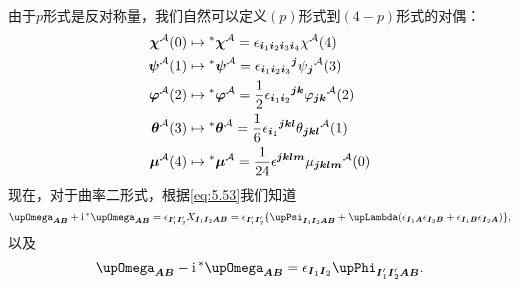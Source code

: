 由于$p$形式是反对称量，我们自然可以定义$( p)$形式到$( 4-p)$形式的对偶：
\begin{equation*}
	\begin{aligned}
		\boldsymbol{\chi}^{\mathcal{A}}( 0) & \mapsto \prescript{*}{}{}\boldsymbol{\chi}^{\mathcal{A}} =\epsilon _{\boldsymbol{i}_{1}\boldsymbol{i}_{2}\boldsymbol{i}_{3}\boldsymbol{i}_{4}} \chi ^{\mathcal{A}}( 4)\\
		\boldsymbol{\psi}^{\mathcal{A}}( 1) & \mapsto \prescript{*}{}{}\boldsymbol{\psi}^{\mathcal{A}} =\epsilon {_{\boldsymbol{i}_{1}\boldsymbol{i}_{2}\boldsymbol{i}_{3}}}^{\boldsymbol{j}} \psi {_{\boldsymbol{j}}}^{\mathcal{A}}( 3)\\
		\boldsymbol{\varphi}^{\mathcal{A}}( 2) & \mapsto \prescript{*}{}{}\boldsymbol{\varphi}^{\mathcal{A}} =\frac{1}{2} \epsilon {_{\boldsymbol{i}_{1}\boldsymbol{i}_{2}}}^{\boldsymbol{jk}} \varphi {_{\boldsymbol{jk}}}^{\mathcal{A}}( 2)\\
		\boldsymbol{\theta}^{\mathcal{A}}( 3) & \mapsto \prescript{*}{}{}\boldsymbol{\theta}^{\mathcal{A}} =\frac{1}{6} \epsilon {_{\boldsymbol{i}_{1}}}^{\boldsymbol{jkl}} \theta {_{\boldsymbol{jkl}}}^{\mathcal{A}}( 1)\\
		\boldsymbol{\mu }^{\mathcal{A}}( 4) & \mapsto \prescript{*}{}{}\boldsymbol{\mu }^{\mathcal{A}} =\frac{1}{24} \epsilon ^{\boldsymbol{jklm}} \mu {_{\boldsymbol{jklm}}}^{\mathcal{A}}( 0)
	\end{aligned}
\end{equation*}
现在，对于曲率二形式，根据\ref{eq:5.53}我们知道
\begin{equation}
	\boldsymbol{\upOmega}_{\boldsymbol{AB}} +\mathrm{i}\prescript{*}{}{}\boldsymbol{\upOmega}_{\boldsymbol{AB}} =\epsilon _{\boldsymbol{I} '_{1}\boldsymbol{I} '_{2}} X_{\boldsymbol{I}_{1}\boldsymbol{I}_{2}\boldsymbol{AB}} =\epsilon _{\boldsymbol{I} '_{1}\boldsymbol{I} '_{2}} \{\upPsi _{\boldsymbol{I}_{1}\boldsymbol{I}_{2}\boldsymbol{AB}} +\upLambda (\epsilon _{\boldsymbol{I}_{1}\boldsymbol{A}} \epsilon _{\boldsymbol{I}_{2}\boldsymbol{B}} +\epsilon _{\boldsymbol{I}_{1}\boldsymbol{B}} \epsilon _{\boldsymbol{I}_{2}\boldsymbol{A}} )\},
	\label{eq:5.85}
\end{equation}
以及
\begin{equation}
	\boldsymbol{\upOmega}_{\boldsymbol{AB}} -\mathrm{i}\prescript{*}{}{}\boldsymbol{\upOmega}_{\boldsymbol{AB}} =\epsilon _{\boldsymbol{I}_{1}\boldsymbol{I}_{2}} \upPhi _{\boldsymbol{I} '_{1}\boldsymbol{I} '_{2}\boldsymbol{AB}} .
	\label{eq:5.86}
\end{equation}
